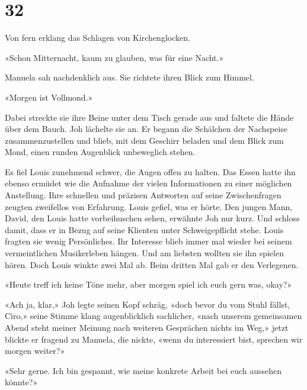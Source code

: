 \chapter{32}



Von fern erklang das Schlagen von Kirchenglocken.

«Schon Mitternacht, kaum zu glauben, was für eine Nacht.»

Manuela sah nachdenklich aus. Sie richtete ihren Blick zum Himmel.

«Morgen ist Vollmond.»

Dabei streckte sie ihre Beine unter dem Tisch gerade aus und faltete die
Hände über dem Bauch. Joh lächelte sie an. Er begann die Schälchen der
Nachspeise zusammenzustellen und blieb, mit dem Geschirr beladen und dem
Blick zum Mond, einen runden Augenblick unbeweglich stehen.

Es fiel Louis zunehmend schwer, die Augen offen zu halten. Das Essen
hatte ihn ebenso ermüdet wie die Aufnahme der vielen Informationen zu
einer möglichen Anstellung. Ihre schnellen und präzisen Antworten auf
seine Zwischenfragen zeugten zweifellos von Erfahrung. Louis gefiel, was
er hörte. Den jungen Mann, David, den Louis hatte vorbeihuschen sehen,
erwähnte Joh nur kurz. Und schloss damit, dass er in Bezug auf seine
Klienten unter Schweigepflicht stehe. 
Louis fragten sie wenig Persönliches. Ihr Interesse blieb immer mal
wieder bei seinem vermeintlichen Musikerleben hängen. Und am liebsten
wollten sie ihn spielen hören. Doch Louis winkte zwei Mal ab. Beim
dritten Mal gab er den Verlegenen.

«Heute treff ich keine Töne mehr, aber morgen spiel ich euch gern was,
okay?»

«Ach ja, klar,» Joh legte seinen Kopf schräg, «doch bevor du vom Stuhl
fällst, Ciro,» seine Stimme klang augenblicklich sachlicher, «nach
unserem gemeinsamen Abend steht meiner Meinung nach weiteren Gesprächen
nichts im Weg,» jetzt blickte er fragend zu Manuela, die nickte, «wenn
du interessiert bist, sprechen wir morgen weiter?»

«Sehr gerne. Ich bin gespannt, wie meine konkrete Arbeit bei euch
aussehen könnte?»

